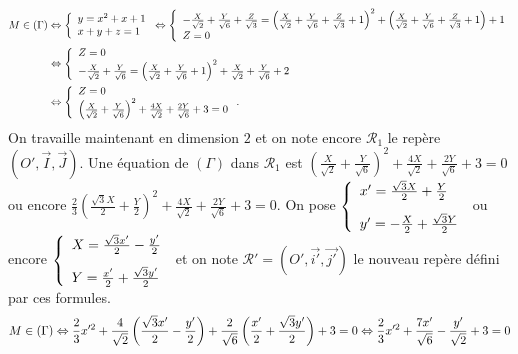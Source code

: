 {{\begin{align*}\ensuremath
M\in(\Gamma)&\Leftrightarrow\left\{
\begin{array}{l}
y=x^2+x+1\\
x+y+z=1
\end{array}\right.\Leftrightarrow\left\{
\begin{array}{l}
-\frac{X}{\sqrt{2}}+\frac{Y}{\sqrt{6}}+\frac{Z}{\sqrt{3}}=\left(\frac{X}{\sqrt{2}}+\frac{Y}{\sqrt{6}}+\frac{Z}{\sqrt{3}}+1\right)^2+\left(\frac{X}{\sqrt{2}}+\frac{Y}{\sqrt{6}}+\frac{Z}{\sqrt{3}}+1\right)+1\\
Z=0
\end{array}\right.
\\
 &\Leftrightarrow\left\{
\begin{array}{l}
Z=0\\
-\frac{X}{\sqrt{2}}+\frac{Y}{\sqrt{6}}=\left(\frac{X}{\sqrt{2}}+\frac{Y}{\sqrt{6}}+1\right)^2+\frac{X}{\sqrt{2}}+\frac{Y}{\sqrt{6}}+2\end{array}\right.
\\
 &\Leftrightarrow\left\{
\begin{array}{l}
Z=0\\
\left(\frac{X}{\sqrt{2}}+\frac{Y}{\sqrt{6}}\right)^2+\frac{4X}{\sqrt{2}}+\frac{2Y}{\sqrt{6}}+3=0\end{array}\right..
\end{align*}
On travaille maintenant en dimension $2$ et on note encore $\mathcal{R}_1$ le repère $\left(O',\overrightarrow{I},\overrightarrow{J}\right)$. Une équation de $(\Gamma)$ dans $\mathcal{R}_1$ est 
$\left(\frac{X}{\sqrt{2}}+\frac{Y}{\sqrt{6}}\right)^2+\frac{4X}{\sqrt{2}}+\frac{2Y}{\sqrt{6}}+3=0$ ou encore $\frac{2}{3}\left(\frac{\sqrt{3}X}{2}+\frac{Y}{2}\right)^2+\frac{4X}{\sqrt{2}}+\frac{2Y}{\sqrt{6}}+3=0$.
On pose $\left\{
\begin{array}{l}
x'=\frac{\sqrt{3}X}{2}+\frac{Y}{2}\\
\rule{0mm}{7mm}y'=-\frac{X}{2}+\frac{\sqrt{3}Y}{2}
\end{array}
\right.$ ou encore $\left\{
\begin{array}{l}
X=\frac{\sqrt{3}x'}{2}-\frac{y'}{2}\\
\rule{0mm}{7mm}Y=\frac{x'}{2}+\frac{\sqrt{3}y'}{2}
\end{array}
\right.$ et on note $\mathcal{R}'=\left(O',\overrightarrow{i'},\overrightarrow{j'}\right)$ le nouveau repère défini par ces formules.
\begin{align*}\ensuremath
M\in(\Gamma)&\Leftrightarrow\frac{2}{3}x'^2+\frac{4}{\sqrt{2}}\left(\frac{\sqrt{3}x'}{2}-\frac{y'}{2}\right)+\frac{2}{\sqrt{6}}\left(\frac{x'}{2}+\frac{\sqrt{3}y'}{2}\right)+3=0\Leftrightarrow\frac{2}{3}x'^2+\frac{7x'}{\sqrt{6}}-\frac{y'}{\sqrt{2}}+3=0\\

\end{align*}}}
